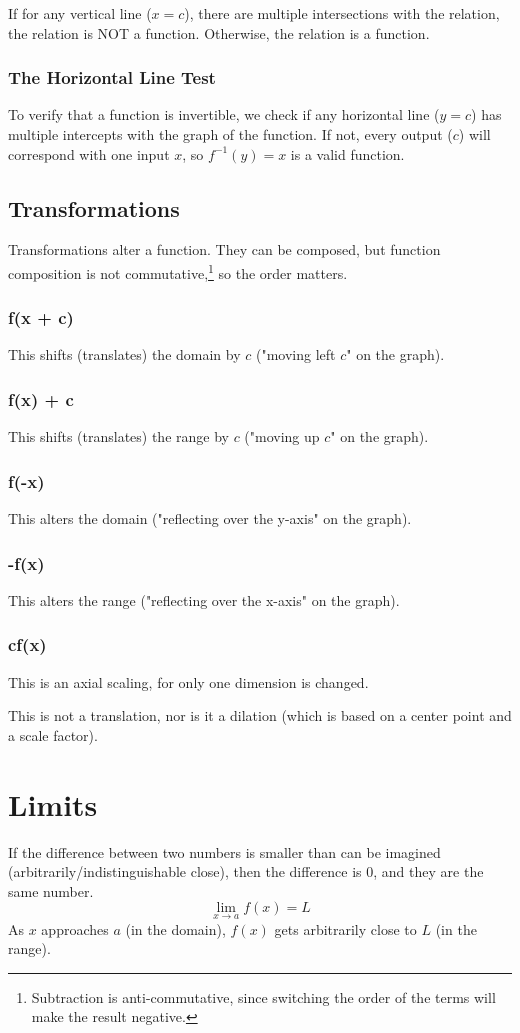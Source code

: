 \documentclass{article}
\begin{document}
If for any vertical line ($x=c$), there are multiple intersections with the relation, the relation is NOT a function. Otherwise, the relation is a function.

\subsubsection{The Horizontal Line Test}
To verify that a function is invertible, we check if any horizontal line ($y=c$) has multiple intercepts with the graph of the function. If not, every output ($c$) will correspond with one input $x$, so $f^{-1}(y)=x$ is a valid function.

\subsection{Transformations}
Transformations alter a function. They can be composed, but function composition is not commutative,\footnote{Subtraction is anti-commutative, since switching the order of the terms will make the result negative.} so the order matters.


\subsubsection{f(x + c)}
This shifts (translates) the domain by $c$ ("moving left $c$" on the graph).
\subsubsection{f(x) + c}
This shifts (translates) the range by $c$ ("moving up $c$" on the graph).
\subsubsection{f(-x)}
This alters the domain ("reflecting over the y-axis" on the graph).
\subsubsection{-f(x)}
This alters the range ("reflecting over the x-axis" on the graph).
\subsubsection{cf(x)}
This is an axial scaling, for only one dimension is changed.

This is not a translation, nor is it a dilation (which is based on a center point and a scale factor).

\section{Limits}
If the difference between two numbers is smaller than can be imagined (arbitrarily/indistinguishable close), then the difference is $0$, and they are the same number.
$$\lim_{x\to a}f(x)=L$$
As $x$ approaches $a$ (in the domain), $f(x)$ gets arbitrarily close to $L$ (in the range).
\end{document}
